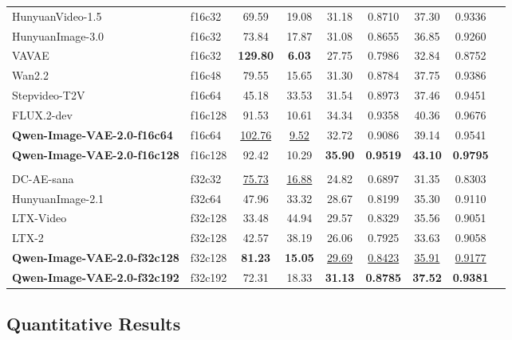 \begin{table}[t]
{\begin{tabular}{llccccccc}
HunyuanVideo-1.5~\citep{hunyuanvideo1.5} & f16c32   & 69.59  & 19.08 & 31.18 & 0.8710 & 37.30 & 0.9336 \\
HunyuanImage-3.0~\citep{hunyuanimage3.0} & f16c32   & 73.84  & 17.87 & 31.08 & 0.8655 & 36.85 & 0.9260 \\
VAVAE~\citep{vavae} & f16c32 & \textbf{129.80} & \textbf{6.03} & 27.75 & 0.7986 & 32.84 & 0.8752 \\
Wan2.2~\citep{wan2025wan}           & f16c48   & 79.55  & 15.65 & 31.30 & 0.8784 & 37.75 & 0.9386 \\
Stepvideo-T2V~\citep{stepvideo}    & f16c64   & 45.18  & 33.53 & 31.54 & 0.8973 & 37.46 & 0.9451 \\
FLUX.2-dev~\citep{flux2}       & f16c128  & 91.53  & 10.61 & 34.34 & 0.9358 & 40.36 & 0.9676 \\
\rowcolor{blue!5} \textbf{Qwen-Image-VAE-2.0-f16c64} & f16c64 & \underline{102.76} & \underline{9.52} & 32.72 & 0.9086 & 39.14 & 0.9541 \\
\rowcolor{blue!5} \textbf{Qwen-Image-VAE-2.0-f16c128} & f16c128 & 92.42 & 10.29 & \textbf{35.90} & \textbf{0.9519} & \textbf{43.10} & \textbf{0.9795} \\
\midrule
\rowcolor{gray!8} \multicolumn{8}{l}{\textit{f32 Compression VAEs}} \\
DC-AE-sana~\citep{dcae}        & f32c32   & \underline{75.73}  & \underline{16.88} & 24.82 & 0.6897 & 31.35 & 0.8303 \\
HunyuanImage-2.1~\citep{hunyuanimage2.1} & f32c64   & 47.96  & 33.32 & 28.67 & 0.8199 & 35.30 & 0.9110 \\
LTX-Video~\citep{ltx}            & f32c128  & 33.48  & 44.94 & 29.57 & 0.8329 & 35.56 & 0.9051 \\
LTX-2~\citep{ltx2}            & f32c128  & 42.57  & 38.19 & 26.06 & 0.7925 & 33.63 & 0.9058 \\
\rowcolor{blue!5} \textbf{Qwen-Image-VAE-2.0-f32c128} & f32c128 & \textbf{81.23} & \textbf{15.05} & \underline{29.69} & \underline{0.8423} & \underline{35.91} & \underline{0.9177} \\
\rowcolor{blue!5} \textbf{Qwen-Image-VAE-2.0-f32c192} & f32c192 & 72.31 & 18.33 & \textbf{31.13} & \textbf{0.8785} & \textbf{37.52} & \textbf{0.9381} \\
\bottomrule
\end{tabular}
}
\end{table}

\subsection{Quantitative Results}
